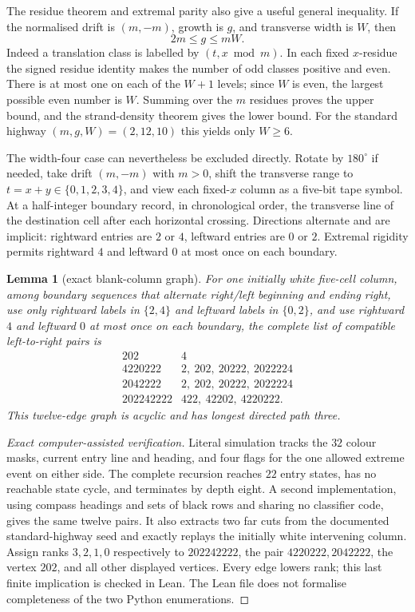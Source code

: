 \documentclass[11pt,reqno]{amsart}
\theoremstyle{plain}
\newtheorem{lemma}[theorem]{Lemma}
\theoremstyle{definition}
\begin{document}
The residue theorem and extremal parity also give a useful general inequality.  If
the normalised drift is $(m,-m)$, growth is $g$, and transverse width is $W$, then
\begin{equation}\label{eq:widthgrowth}
2m\le g\le mW.
\end{equation}
Indeed a translation class is labelled by $(t,x\bmod m)$.  In each fixed
$x$-residue the signed residue identity makes the number of odd classes positive and
even.  There is at most one on each of the $W+1$ levels; since $W$ is even, the
largest possible even number is $W$.  Summing over the $m$ residues proves the upper
bound, and the strand-density theorem gives the lower bound.  For the standard
highway $(m,g,W)=(2,12,10)$ this yields only $W\ge6$.

The width-four case can nevertheless be excluded directly.  Rotate by $180^\circ$
if needed, take drift $(m,-m)$ with $m>0$, shift the transverse range to
$t=x+y\in\{0,1,2,3,4\}$, and view each fixed-$x$ column as a five-bit tape symbol.
At a half-integer boundary record, in chronological order, the transverse line of
the destination cell after each horizontal crossing.  Directions alternate and are
implicit: rightward entries are $2$ or $4$, leftward entries are $0$ or $2$.
Extremal rigidity permits rightward $4$ and leftward $0$ at most once on each
boundary.

\begin{lemma}[exact blank-column graph]\label{lem:blankcolumn}
For one initially white five-cell column, among boundary sequences that alternate
right/left beginning and ending right, use only rightward labels in $\{2,4\}$ and
leftward labels in $\{0,2\}$, and use rightward $4$ and leftward $0$ at most once on
each boundary, the complete list of compatible left-to-right pairs is
\[
\begin{array}{c|l}
202&4\\
4220222&2,\ 202,\ 20222,\ 2022224\\
2042222&2,\ 202,\ 20222,\ 2022224\\
202242222&422,\ 42202,\ 4220222.
\end{array}
\]
This twelve-edge graph is acyclic and has longest directed path three.
\end{lemma}

\begin{proof}[Exact computer-assisted verification]
Literal simulation tracks the $32$ colour masks, current entry line and heading,
and four flags for the one allowed extreme event on either side.  The complete
recursion reaches $22$ entry states, has no reachable state cycle, and terminates by
depth eight.  A second implementation, using compass headings and sets of black rows
and sharing no classifier code, gives the same twelve pairs.  It also extracts two
far cuts from the documented standard-highway seed and exactly replays the initially
white intervening column.  Assign ranks $3,2,1,0$ respectively to
$202242222$, the pair $4220222,2042222$, the vertex $202$, and all other displayed
vertices.  Every edge lowers rank; this last finite implication is checked in Lean.
The Lean file does not formalise completeness of the two Python enumerations.
\end{proof}
\end{document}

